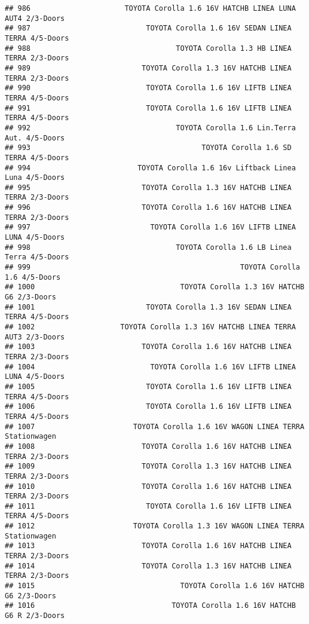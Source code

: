 \documentclass[]{article}
\begin{document}
\begin{verbatim}
## 986                      TOYOTA Corolla 1.6 16V HATCHB LINEA LUNA AUT4 2/3-Doors
## 987                           TOYOTA Corolla 1.6 16V SEDAN LINEA TERRA 4/5-Doors
## 988                                  TOYOTA Corolla 1.3 HB LINEA TERRA 2/3-Doors
## 989                          TOYOTA Corolla 1.3 16V HATCHB LINEA TERRA 2/3-Doors
## 990                           TOYOTA Corolla 1.6 16V LIFTB LINEA TERRA 4/5-Doors
## 991                           TOYOTA Corolla 1.6 16V LIFTB LINEA TERRA 4/5-Doors
## 992                                  TOYOTA Corolla 1.6 Lin.Terra Aut. 4/5-Doors
## 993                                        TOYOTA Corolla 1.6 SD TERRA 4/5-Doors
## 994                         TOYOTA Corolla 1.6 16v Liftback Linea Luna 4/5-Doors
## 995                          TOYOTA Corolla 1.3 16V HATCHB LINEA TERRA 2/3-Doors
## 996                          TOYOTA Corolla 1.6 16V HATCHB LINEA TERRA 2/3-Doors
## 997                            TOYOTA Corolla 1.6 16V LIFTB LINEA LUNA 4/5-Doors
## 998                                  TOYOTA Corolla 1.6 LB Linea Terra 4/5-Doors
## 999                                                 TOYOTA Corolla 1.6 4/5-Doors
## 1000                                  TOYOTA Corolla 1.3 16V HATCHB G6 2/3-Doors
## 1001                          TOYOTA Corolla 1.3 16V SEDAN LINEA TERRA 4/5-Doors
## 1002                    TOYOTA Corolla 1.3 16V HATCHB LINEA TERRA AUT3 2/3-Doors
## 1003                         TOYOTA Corolla 1.6 16V HATCHB LINEA TERRA 2/3-Doors
## 1004                           TOYOTA Corolla 1.6 16V LIFTB LINEA LUNA 4/5-Doors
## 1005                          TOYOTA Corolla 1.6 16V LIFTB LINEA TERRA 4/5-Doors
## 1006                          TOYOTA Corolla 1.6 16V LIFTB LINEA TERRA 4/5-Doors
## 1007                       TOYOTA Corolla 1.6 16V WAGON LINEA TERRA Stationwagen
## 1008                         TOYOTA Corolla 1.6 16V HATCHB LINEA TERRA 2/3-Doors
## 1009                         TOYOTA Corolla 1.3 16V HATCHB LINEA TERRA 2/3-Doors
## 1010                         TOYOTA Corolla 1.6 16V HATCHB LINEA TERRA 2/3-Doors
## 1011                          TOYOTA Corolla 1.6 16V LIFTB LINEA TERRA 4/5-Doors
## 1012                       TOYOTA Corolla 1.3 16V WAGON LINEA TERRA Stationwagen
## 1013                         TOYOTA Corolla 1.6 16V HATCHB LINEA TERRA 2/3-Doors
## 1014                         TOYOTA Corolla 1.3 16V HATCHB LINEA TERRA 2/3-Doors
## 1015                                  TOYOTA Corolla 1.6 16V HATCHB G6 2/3-Doors
## 1016                                TOYOTA Corolla 1.6 16V HATCHB G6 R 2/3-Doors

\end{verbatim}
\end{document}

